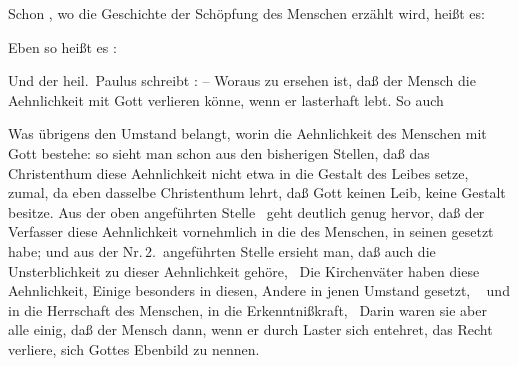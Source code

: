 \begin{aufza}
\item Schon , wo die Geschichte der Schöpfung des Menschen erzählt wird, heißt es: 
\item Eben so heißt es : 
\item Und der heil.\ Paulus schreibt :  -- Woraus zu ersehen ist, daß der Mensch die Aehnlichkeit mit Gott verlieren könne, wenn er lasterhaft lebt. So auch 
\item Was übrigens den Umstand belangt, worin die Aehnlichkeit des Menschen mit Gott bestehe: so sieht man schon aus den bisherigen Stellen, daß das Christenthum diese Aehnlichkeit nicht etwa in die Gestalt des Leibes setze, zumal, da eben dasselbe Christenthum lehrt, daß Gott keinen Leib, keine Gestalt besitze. Aus der oben angeführten Stelle \ geht deutlich genug hervor, daß der Verfasser diese Aehnlichkeit vornehmlich in die  des Menschen, in seinen  gesetzt habe; und aus der Nr.\,2.\ angeführten Stelle ersieht man, daß auch die Unsterblichkeit zu dieser Aehnlichkeit gehöre, \usw\ Die Kirchenväter haben diese Aehnlichkeit, Einige besonders in diesen, Andere in jenen Umstand gesetzt, \zB\  und  in die Herrschaft des Menschen,  in die Erkenntnißkraft, \usw\ Darin waren sie aber alle einig, daß der Mensch dann, wenn er durch Laster sich entehret, das Recht verliere, sich Gottes Ebenbild zu nennen.~
\end{aufza}

